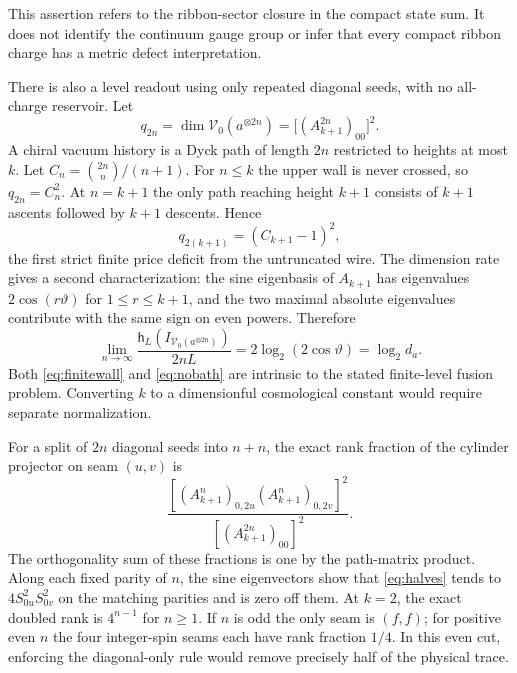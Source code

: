 \documentclass[11pt]{article}
\numberwithin{equation}{section}
\theoremstyle{definition}
\theoremstyle{remark}
\newcommand{\State}{\mathcal V}
\begin{document}
This assertion refers to the ribbon-sector closure in the compact state sum. It does not identify the continuum gauge group or infer that every compact ribbon charge has a metric defect interpretation.

There is also a level readout using only repeated diagonal seeds, with no all-charge reservoir. Let
\[
    q_{2n}=\dim\State_0(a^{\otimes 2n})
           =\big[(A_{k+1}^{2n})_{00}\big]^2 .
\]
A chiral vacuum history is a Dyck path of length \(2n\) restricted to heights at most \(k\). Let \(C_n=\binom{2n}{n}/(n+1)\). For \(n\le k\) the upper wall is never crossed, so \(q_{2n}=C_n^2\). At \(n=k+1\) the only path reaching height \(k+1\) consists of \(k+1\) ascents followed by \(k+1\) descents. Hence
\begin{equation}\label{eq:finitewall}
    q_{2(k+1)}=(C_{k+1}-1)^2,
\end{equation}
the first strict finite price deficit from the untruncated wire. The dimension rate gives a second characterization: the sine eigenbasis of \(A_{k+1}\) has eigenvalues \(2\cos(r\vartheta)\) for \(1\le r\le k+1\), and the two maximal absolute eigenvalues contribute with the same sign on even powers. Therefore
\begin{equation}\label{eq:nobath}
   \lim_{n\to\infty}\frac{\mathsf h_L(I_{\State_0(a^{\otimes 2n})})}{2nL}
        =2\log_2(2\cos\vartheta)=\log_2 d_a .
\end{equation}
Both \eqref{eq:finitewall} and \eqref{eq:nobath} are intrinsic to the stated finite-level fusion problem. Converting \(k\) to a dimensionful cosmological constant would require separate normalization.

For a split of \(2n\) diagonal seeds into \(n+n\), the exact rank fraction of the cylinder projector on seam \((u,v)\) is
\begin{equation}\label{eq:halves}
 \frac{[(A_{k+1}^{n})_{0,2u}(A_{k+1}^{n})_{0,2v}]^2}
      {[(A_{k+1}^{2n})_{00}]^2}.
\end{equation}
The orthogonality sum of these fractions is one by the path-matrix product. Along each fixed parity of \(n\), the sine eigenvectors show that \eqref{eq:halves} tends to \(4S_{0u}^2S_{0v}^2\) on the matching parities and is zero off them. At \(k=2\), the exact doubled rank is \(4^{n-1}\) for \(n\ge1\). If \(n\) is odd the only seam is \((f,f)\); for positive even \(n\) the four integer-spin seams each have rank fraction \(1/4\). In this even cut, enforcing the diagonal-only rule would remove precisely half of the physical trace.
\end{document}
